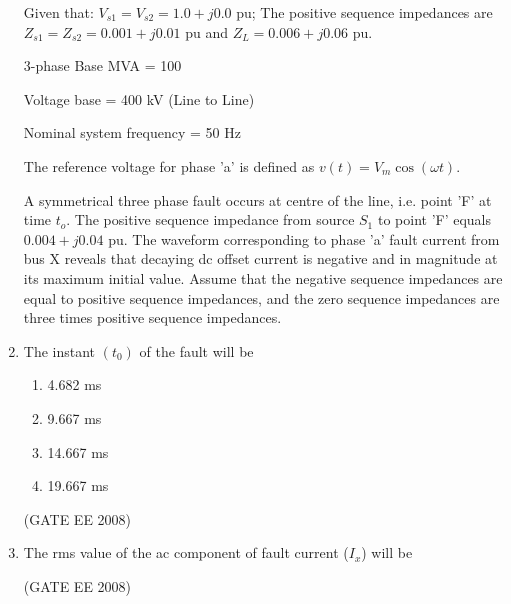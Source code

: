 \documentclass[journal,12pt,onecolumn]{IEEEtran}
\theoremstyle{remark}
\begin{document}
\begin{enumerate}[start=1, label=Q.\arabic*]
Given that:
$V_{s1} = V_{s2} = 1.0+j0.0$ pu;
The positive sequence impedances are $Z_{s1} = Z_{s2} = 0.001+j0.01$ pu and $Z_L = 0.006+j0.06$ pu.

3-phase Base MVA = 100

Voltage base = 400 kV (Line to Line)

Nominal system frequency = 50 Hz

The reference voltage for phase 'a' is defined as $v(t) = V_m \cos(\omega t)$.

A symmetrical three phase fault occurs at centre of the line, i.e. point 'F' at time $t_o$. The positive sequence impedance from source $S_1$ to point 'F' equals $0.004+j0.04$ pu. The waveform corresponding to phase 'a' fault current from bus X reveals that decaying dc offset current is negative and in magnitude at its maximum initial value. Assume that the negative sequence impedances are equal to positive sequence impedances, and the zero sequence impedances are three times positive sequence impedances. \\[10mm]


\item The instant $(t_0)$ of the fault will be

\begin{multicols}{2}
\begin{enumerate}
    \item 4.682 ms
    \item 9.667 ms
    \item 14.667 ms
    \item 19.667 ms
\end{enumerate}
\end{multicols}
\hfill (GATE EE 2008) \\[5mm]

\item  The rms value of the ac component of fault current ($I_x$) will be
\begin{enumerate}
\end{enumerate}
\hfill (GATE EE 2008) \\[5mm]


\end{enumerate}
\end{document}

